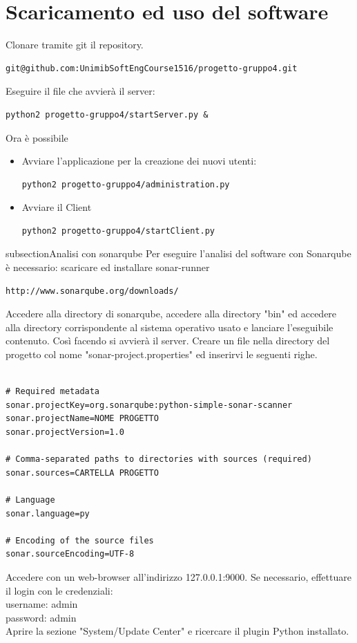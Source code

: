 \documentclass[12pt]{scrartcl}
\begin{document}
\section{Scaricamento ed uso del software}
Clonare tramite git il repository.
\begin{verbatim}
git@github.com:UnimibSoftEngCourse1516/progetto-gruppo4.git
\end{verbatim}
Eseguire il file che avvier\`a il server:
\begin{verbatim}
python2 progetto-gruppo4/startServer.py &
\end{verbatim}
Ora \`e possibile
    \begin{itemize}
        \item Avviare l'applicazione per la creazione dei nuovi utenti:
        \begin{verbatim}
python2 progetto-gruppo4/administration.py
        \end{verbatim}
        \item Avviare il Client
        \begin{verbatim}
python2 progetto-gruppo4/startClient.py
        \end{verbatim}
    \end{itemize}
subsection{Analisi con sonarqube}
Per eseguire l'analisi del software con Sonarqube \`e necessario:
scaricare ed installare sonar-runner
\begin{verbatim}
http://www.sonarqube.org/downloads/
\end{verbatim}
Accedere alla directory di sonarqube, accedere alla
directory "bin" ed accedere alla directory corrispondente al sistema operativo usato e lanciare
l'eseguibile contenuto. Cos\`i facendo si avvier\`a il server. Creare un file nella directory
del progetto col nome "sonar-project.properties" ed inserirvi le seguenti righe.

\begin{verbatim}

# Required metadata
sonar.projectKey=org.sonarqube:python-simple-sonar-scanner
sonar.projectName=NOME PROGETTO
sonar.projectVersion=1.0

# Comma-separated paths to directories with sources (required)
sonar.sources=CARTELLA PROGETTO

# Language
sonar.language=py

# Encoding of the source files
sonar.sourceEncoding=UTF-8

\end{verbatim}
Accedere con un web-browser all'indirizzo 127.0.0.1:9000.
Se necessario, effettuare il login con le credenziali:\\
username: admin\\
password: admin\\
Aprire la sezione "System/Update Center" e ricercare il plugin Python installato.
\end{document}
